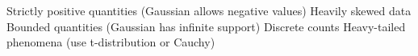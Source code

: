 \PSno{} Strictly positive quantities (Gaussian allows negative values)\PSbr{}\PSno{} Heavily skewed data\PSbr{}\PSno{} Bounded quantities (Gaussian has infinite support)\PSbr{}\PSno{} Discrete counts\PSbr{}\PSno{} Heavy-tailed phenomena (use t-distribution or Cauchy)



\begin{Shaded}
\begin{Highlighting}[]
 \OperatorTok{=} \OperatorTok{;}           
 \OperatorTok{=} \OperatorTok{;}      

 \OperatorTok{=} \NormalTok{(} \OperatorTok{{-}} \OperatorTok{*}\OperatorTok{,}  \OperatorTok{+} \OperatorTok{*}\OperatorTok{,} \NormalTok{)}\OperatorTok{;}
 \OperatorTok{=} \NormalTok{(}\OperatorTok{,} \OperatorTok{,} \NormalTok{)}\OperatorTok{;}


\end{Highlighting}
\end{Shaded}
